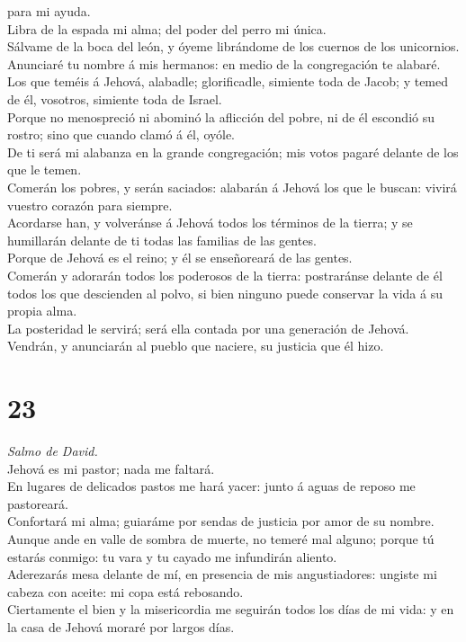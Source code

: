 para mi ayuda.\\
 Libra de la espada mi alma; del poder del perro mi
única.\\
 Sálvame de la boca del león, y óyeme librándome de los
cuernos de los unicornios.\\
 Anunciaré tu nombre á mis hermanos: en medio de la
congregación te alabaré.\\
 Los que teméis á Jehová, alabadle; glorificadle, simiente
toda de Jacob; y temed de él, vosotros, simiente toda de Israel.\\
 Porque no menospreció ni abominó la aflicción del pobre,
ni de él escondió su rostro; sino que cuando clamó á él, oyóle.\\
 De ti será mi alabanza en la grande congregación; mis
votos pagaré delante de los que le temen.\\
 Comerán los pobres, y serán saciados: alabarán á Jehová
los que le buscan: vivirá vuestro corazón para siempre.\\
 Acordarse han, y volveránse á Jehová todos los términos de
la tierra; y se humillarán delante de ti todas las familias de las
gentes.\\
 Porque de Jehová es el reino; y él se enseñoreará de las
gentes.\\
 Comerán y adorarán todos los poderosos de la tierra:
postraránse delante de él todos los que descienden al polvo, si bien
ninguno puede conservar la vida á su propia alma.\\
 La posteridad le servirá; será ella contada por una
generación de Jehová.\\
 Vendrán, y anunciarán al pueblo que naciere, su justicia
que él hizo.

\hypertarget{section-22}{%
\section{23}\label{section-22}}

 \emph{Salmo de David.}\\
Jehová es mi pastor; nada me faltará.\\
 En lugares de delicados pastos me hará yacer: junto á aguas
de reposo me pastoreará.\\
 Confortará mi alma; guiaráme por sendas de justicia por
amor de su nombre.\\
 Aunque ande en valle de sombra de muerte, no temeré mal
alguno; porque tú estarás conmigo: tu vara y tu cayado me infundirán
aliento.\\
 Aderezarás mesa delante de mí, en presencia de mis
angustiadores: ungiste mi cabeza con aceite: mi copa está rebosando.\\
 Ciertamente el bien y la misericordia me seguirán todos los
días de mi vida: y en la casa de Jehová moraré por largos días.

